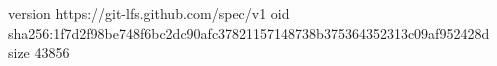version https://git-lfs.github.com/spec/v1
oid sha256:1f7d2f98be748f6bc2dc90afc37821157148738b375364352313c09af952428d
size 43856
